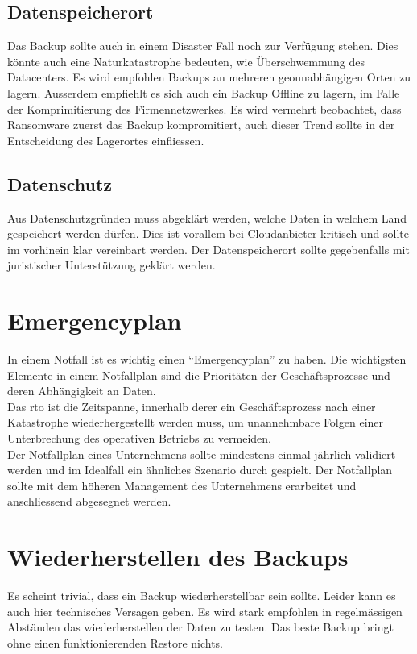 \subsection{Datenspeicherort}
Das Backup sollte auch in einem Disaster Fall noch zur Verfügung stehen.
Dies könnte auch eine Naturkatastrophe bedeuten, wie Überschwemmung des Datacenters.
Es wird empfohlen Backups an mehreren geounabhängigen Orten zu lagern.
Ausserdem empfiehlt es sich auch ein Backup Offline zu lagern, im Falle der Komprimitierung des Firmennetzwerkes.
Es wird vermehrt beobachtet, dass Ransomware zuerst das Backup kompromitiert, auch dieser Trend sollte in der Entscheidung des Lagerortes einfliessen.



\subsection{Datenschutz}
Aus Datenschutzgründen muss abgeklärt werden, welche Daten in welchem Land gespeichert werden dürfen.
Dies ist vorallem bei Cloudanbieter kritisch und sollte im vorhinein klar vereinbart werden.
Der Datenspeicherort sollte gegebenfalls mit juristischer Unterstützung geklärt werden.

\section{Emergencyplan}
In einem Notfall ist es wichtig einen ``Emergencyplan'' zu haben.
Die wichtigsten Elemente in einem Notfallplan sind die Prioritäten der Geschäftsprozesse und deren Abhängigkeit an Daten.\\


Das \acrfull{rto} ist die Zeitspanne, innerhalb derer ein Geschäftsprozess nach einer Katastrophe wiederhergestellt werden muss, um unannehmbare Folgen einer Unterbrechung des operativen Betriebs zu vermeiden.\\

Der Notfallplan eines Unternehmens sollte mindestens einmal jährlich validiert werden und im Idealfall ein ähnliches Szenario durch gespielt.
Der Notfallplan sollte mit dem höheren Management des Unternehmens erarbeitet und anschliessend abgesegnet werden.


\section{Wiederherstellen des Backups}
Es scheint trivial, dass ein Backup wiederherstellbar sein sollte.
Leider kann es auch hier technisches Versagen geben.
Es wird stark empfohlen in regelmässigen Abständen das wiederherstellen der Daten zu testen.
Das beste Backup bringt ohne einen funktionierenden Restore nichts.